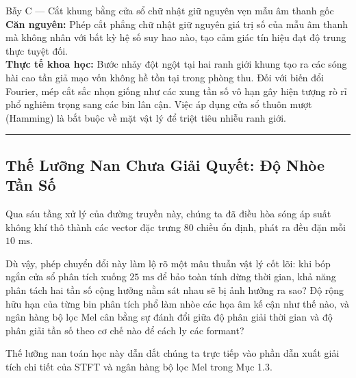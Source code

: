 \documentclass[11pt,a4paper]{article}
\begin{document}
\begin{misconceptionbox}{Bẫy C --- Cắt khung bằng cửa sổ chữ nhật giữ nguyên vẹn mẫu âm thanh gốc}
\textbf{Căn nguyên:} Phép cắt phẳng chữ nhật giữ nguyên giá trị số của mẫu âm thanh mà không nhân với bất kỳ hệ số suy hao nào, tạo cảm giác tín hiệu đạt độ trung thực tuyệt đối.\\[1mm]
\textbf{Thực tế khoa học:} Bước nhảy đột ngột tại hai ranh giới khung tạo ra các sóng hài cao tần giả mạo vốn không hề tồn tại trong phòng thu. Đối với biến đổi Fourier, mép cắt sắc nhọn giống như các xung tần số vô hạn gây hiện tượng rò rỉ phổ nghiêm trọng sang các bin lân cận. Việc áp dụng cửa sổ thuôn mượt (Hamming) là bắt buộc về mặt vật lý để triệt tiêu nhiễu ranh giới.
\end{misconceptionbox}

\smallskip
\hrule
\smallskip

\subsection*{Thế Lưỡng Nan Chưa Giải Quyết: Độ Nhòe Tần Số}

Qua sáu tầng xử lý của đường truyền này, chúng ta đã điều hòa sóng áp suất không khí thô thành các vector đặc trưng 80 chiều ổn định, phát ra đều đặn mỗi $10\text{ ms}$.

Dù vậy, phép chuyển đổi này làm lộ rõ một mâu thuẫn vật lý cốt lõi: khi bóp ngắn cửa sổ phân tích xuống $25\text{ ms}$ để bảo toàn tính dừng thời gian, khả năng phân tách hai tần số cộng hưởng nằm sát nhau sẽ bị ảnh hưởng ra sao? Độ rộng hữu hạn của từng bin phân tích phổ làm nhòe các họa âm kế cận như thế nào, và ngân hàng bộ lọc Mel cân bằng sự đánh đổi giữa độ phân giải thời gian và độ phân giải tần số theo cơ chế nào để cách ly các formant?

Thế lưỡng nan toán học này dẫn dắt chúng ta trực tiếp vào phần dẫn xuất giải tích chi tiết của STFT và ngân hàng bộ lọc Mel trong Mục 1.3.
\end{document}
